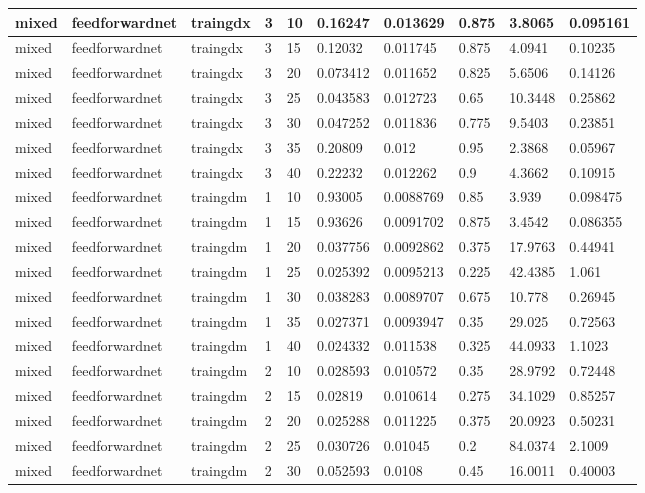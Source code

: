 \begin{longtable}{lllllllll}
mixed & feedforwardnet & traingdx & 3 & 10 & 0.16247 & 0.013629 & 0.875 & 3.8065 & 0.095161 \\ \hline 
mixed & feedforwardnet & traingdx & 3 & 15 & 0.12032 & 0.011745 & 0.875 & 4.0941 & 0.10235 \\ \hline 
mixed & feedforwardnet & traingdx & 3 & 20 & 0.073412 & 0.011652 & 0.825 & 5.6506 & 0.14126 \\ \hline 
mixed & feedforwardnet & traingdx & 3 & 25 & 0.043583 & 0.012723 & 0.65 & 10.3448 & 0.25862 \\ \hline 
mixed & feedforwardnet & traingdx & 3 & 30 & 0.047252 & 0.011836 & 0.775 & 9.5403 & 0.23851 \\ \hline 
mixed & feedforwardnet & traingdx & 3 & 35 & 0.20809 & 0.012 & 0.95 & 2.3868 & 0.05967 \\ \hline 
mixed & feedforwardnet & traingdx & 3 & 40 & 0.22232 & 0.012262 & 0.9 & 4.3662 & 0.10915 \\ \hline 
mixed & feedforwardnet & traingdm & 1 & 10 & 0.93005 & 0.0088769 & 0.85 & 3.939 & 0.098475 \\ \hline 
mixed & feedforwardnet & traingdm & 1 & 15 & 0.93626 & 0.0091702 & 0.875 & 3.4542 & 0.086355 \\ \hline 
mixed & feedforwardnet & traingdm & 1 & 20 & 0.037756 & 0.0092862 & 0.375 & 17.9763 & 0.44941 \\ \hline 
mixed & feedforwardnet & traingdm & 1 & 25 & 0.025392 & 0.0095213 & 0.225 & 42.4385 & 1.061 \\ \hline 
mixed & feedforwardnet & traingdm & 1 & 30 & 0.038283 & 0.0089707 & 0.675 & 10.778 & 0.26945 \\ \hline 
mixed & feedforwardnet & traingdm & 1 & 35 & 0.027371 & 0.0093947 & 0.35 & 29.025 & 0.72563 \\ \hline 
mixed & feedforwardnet & traingdm & 1 & 40 & 0.024332 & 0.011538 & 0.325 & 44.0933 & 1.1023 \\ \hline 
mixed & feedforwardnet & traingdm & 2 & 10 & 0.028593 & 0.010572 & 0.35 & 28.9792 & 0.72448 \\ \hline 
mixed & feedforwardnet & traingdm & 2 & 15 & 0.02819 & 0.010614 & 0.275 & 34.1029 & 0.85257 \\ \hline 
mixed & feedforwardnet & traingdm & 2 & 20 & 0.025288 & 0.011225 & 0.375 & 20.0923 & 0.50231 \\ \hline 
mixed & feedforwardnet & traingdm & 2 & 25 & 0.030726 & 0.01045 & 0.2 & 84.0374 & 2.1009 \\ \hline 
mixed & feedforwardnet & traingdm & 2 & 30 & 0.052593 & 0.0108 & 0.45 & 16.0011 & 0.40003 \\ \hline 

\end{longtable}
